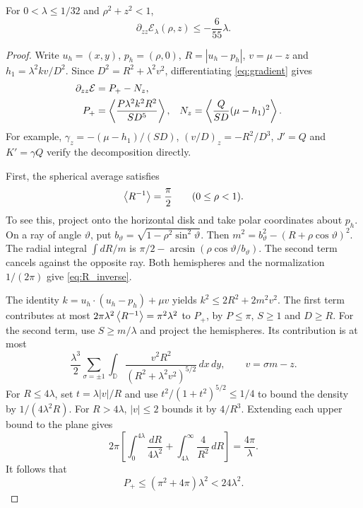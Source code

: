 \begin{lemma}\label{lem:axial_concavity}
For $0<\lambda\le1/32$ and $\rho^2+z^2<1$,
\begin{equation}\label{eq:thin_concavity}
 \partial_{zz}\mathcal E_\lambda(\rho,z)\le-\frac6{55}\lambda.
\end{equation}
\end{lemma}
\begin{proof}
Write $u_h=(x,y)$, $p_h=(\rho,0)$, $R=|u_h-p_h|$, $v=\mu-z$ and $h_1=\lambda^2kv/D^2$. Since $D^2=R^2+\lambda^2v^2$, differentiating \eqref{eq:gradient} gives
\begin{align}
 \partial_{zz}\mathcal E&=P_+-N_z,\label{eq:positive_negative}\\
 P_+&=\left\langle \frac{P\lambda^2k^2R^2}{SD^5}\right\rangle,&
 N_z&=\left\langle \frac Q{SD}(\mu-h_1)^2\right\rangle.\nonumber
\end{align}
For example, $\gamma_z=-(\mu-h_1)/(SD)$, $(v/D)_z=-R^2/D^3$, $J'=Q$ and $K'=\gamma Q$ verify the decomposition directly.

First, the spherical average satisfies
\begin{equation}\label{eq:R_inverse}
 \left\langle R^{-1}\right\rangle=\frac\pi2\qquad(0\le\rho<1).
\end{equation}
To see this, project onto the horizontal disk and take polar coordinates about $p_h$. On a ray of angle $\vartheta$, put $b_\vartheta=\sqrt{1-\rho^2\sin^2\vartheta}$. Then $m^2=b_\vartheta^2-(R+\rho\cos\vartheta)^2$. The radial integral $\int dR/m$ is $\pi/2-\arcsin(\rho\cos\vartheta/b_\vartheta)$. The second term cancels against the opposite ray. Both hemispheres and the normalization $1/(2\pi)$ give \eqref{eq:R_inverse}.

The identity $k=u_h\cdot(u_h-p_h)+\mu v$ yields $k^2\le2R^2+2m^2v^2$. The first term contributes at most $2\pi\lambda^2\left\langle R^{-1}\right\rangle=\pi^2\lambda^2$ to $P_+$, by $P\le\pi$, $S\ge1$ and $D\ge R$. For the second term, use $S\ge m/\lambda$ and project the hemispheres. Its contribution is at most
\[
 \frac{\lambda^3}{2}\sum_{\sigma=\pm1}\int_{\mathbb D}
 \frac{v^2R^2}{(R^2+\lambda^2v^2)^{5/2}}\,dx\,dy,
 \qquad v=\sigma m-z.
\]
For $R\le4\lambda$, set $t=\lambda|v|/R$ and use $t^2/(1+t^2)^{5/2}\le1/4$ to bound the density by $1/(4\lambda^2R)$. For $R>4\lambda$, $|v|\le2$ bounds it by $4/R^3$. Extending each upper bound to the plane gives
\[
 2\pi\left[\int_0^{4\lambda}\frac{dR}{4\lambda^2}
       +\int_{4\lambda}^\infty\frac4{R^2}\,dR\right]=\frac{4\pi}{\lambda}.
\]
It follows that
\begin{equation}\label{eq:positive_bound}
 P_+\le(\pi^2+4\pi)\lambda^2<24\lambda^2.
\end{equation}


\end{proof}
